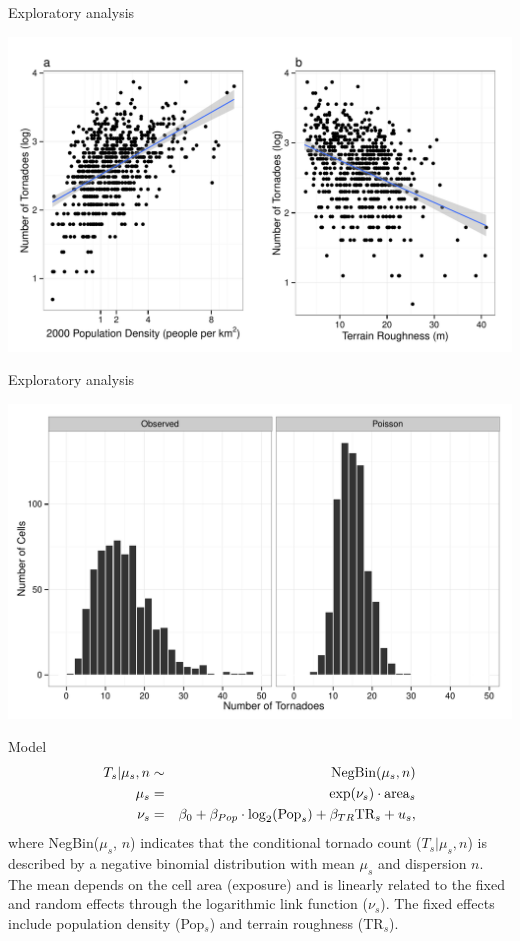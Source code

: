 \documentclass[handout]{beamer}
\begin{document}
\begin{frame}{Exploratory analysis}
\vspace{-1cm}
\begin{center}
\includegraphics[scale=.54]{figures/Scatterplots.pdf}
\end{center}
\end{frame}

\begin{frame}{Exploratory analysis}
\vspace{-1cm}
\begin{center}
\includegraphics[scale=.54]{figures/Distribution.pdf}
\end{center}
\end{frame}

\begin{frame}{Model}
\begin{eqnarray*}
T_s | \mu_s, n&\sim& \hbox{NegBin}(\mu_s, n)   \\
\mu_s &=& \exp(\nu_s) \cdot \hbox{area}_s \\
\nu_s &=& \beta_0 + \beta_{Pop}\cdot\log_2(\hbox{Pop}_s) + \beta_{TR} \hbox{TR}_s + u_s,
\end{eqnarray*}
where NegBin($\mu_s$, $n$) indicates that the conditional tornado count ($T_s|\mu_s,n$) is described by a negative binomial distribution with mean $\mu_s$ and dispersion $n$. The mean depends on the cell area (exposure) and is linearly related to the fixed and random effects through the logarithmic link function ($\nu_s$). The fixed effects include population density (Pop$_s$) and terrain roughness (TR$_s$).
\end{frame}
\end{document}
